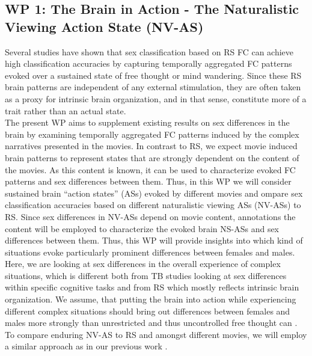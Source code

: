 \documentclass[11pt,a4paper]{article}
\begin{document}
\subsection*{WP 1: The Brain in Action - The Naturalistic Viewing Action State (NV-AS) }
Several studies have shown that sex classification based on RS FC can achieve high classification accuracies 
\parencite{casanovaCombiningGraphMachine2012a,ritchieSexDifferencesAdult2018, weisSexClassificationResting2020a,wierschAccurateSexPrediction2023a,wierschSexDifferencesBrain2021a} 
by capturing temporally aggregated FC patterns evoked over a sustained state of free thought or mind wandering. 
Since these RS brain patterns are independent of any external stimulation, they are often taken as a proxy 
for intrinsic brain organization, and in that sense, constitute more of a trait rather than an actual state.\\ 
The present WP aims to supplement existing results on sex differences in the brain by examining temporally 
aggregated FC patterns induced by the complex narratives presented in the movies. In contrast to RS, 
we expect movie induced brain patterns to represent states that are strongly dependent on the content of the movies. 
As this content is known, it can be used to characterize evoked FC patterns and sex differences between them. 
Thus, in this WP we will consider sustained brain “action states” (ASs) evoked by different movies and 
ompare sex classification accuracies based on different naturalistic viewing ASs (NV-ASs) to RS. 
Since sex differences in NV-ASs depend on movie content, annotations the content will be employed to 
characterize the evoked brain NS-ASs and sex differences between them. 
Thus, this WP will provide insights 
into which kind of situations evoke particularly prominent differences between females and males. Here, we are 
looking at sex differences in the overall experience of complex situations, which is different both from TB 
studies looking at sex differences within specific cognitive tasks and from RS which mostly reflects intrinsic 
brain organization. We assume, that putting the brain into action while experiencing different complex situations 
should bring out differences between females and males more strongly than unrestricted and thus uncontrolled 
free thought can \parencite{vanderwalIndividualDifferencesFunctional2017}.\\
To compare enduring NV-AS to RS and amongst different movies, we will employ a similar approach as 
in our previous work \parencite{weisSexClassificationResting2020a}.\\ 
\end{document}
